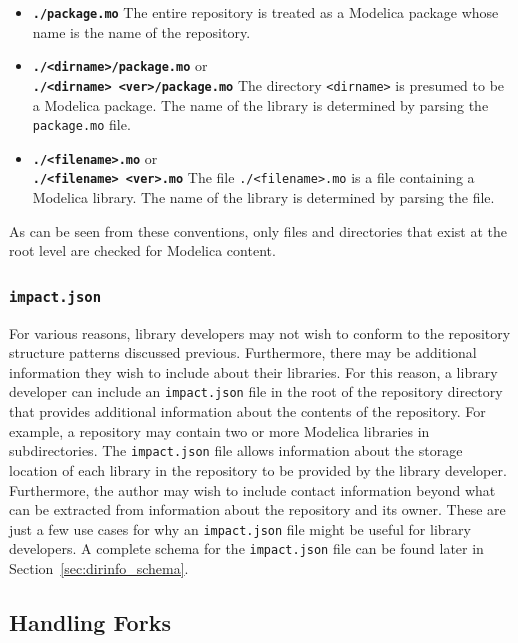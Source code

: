 \documentclass[11pt,a4paper,twocolumn]{article}
\newcommand{\code}[1]{\texttt{#1}} %
\begin{document}
\begin{itemize}[noitemsep]
  \item \textbf{\code{./package.mo}} The entire repository is treated as a Modelica
    package whose name is the name of the repository.

  \item \textbf{\code{./<dirname>/package.mo}} or\\  \textbf{\code{./<dirname>
      <ver>/package.mo}} The directory \code{<dirname>} is presumed to
    be a Modelica package.  The name of the library is determined by
    parsing the \code{package.mo} file.

  \item \textbf{\code{./<filename>.mo}} or\\ \textbf{\code{./<filename> <ver>.mo}} The
    file \code{./<filename>.mo} is a file containing a Modelica
    library.  The name of the library is determined by parsing the
    file.
\end{itemize}

As can be seen from these conventions, only files and directories that
exist at the root level are checked for Modelica content.

\subsubsection{\code{impact.json}}
\label{sec:dirinfo}

For various reasons, library developers may not wish to conform to the
repository structure patterns discussed previous.  Furthermore, there
may be additional information they wish to include about their
libraries.  For this reason, a library developer can include an
\code{impact.json} file in the root of the repository directory that
provides additional information about the contents of the repository.
For example, a repository may contain two or more Modelica libraries
in subdirectories.  The \code{impact.json} file allows information
about the storage location of each library in the repository to be
provided by the library developer.  Furthermore, the author may wish
to include contact information beyond what can be extracted from
information about the repository and its owner.  These are just a few
use cases for why an \code{impact.json} file might be useful for
library developers.  A complete schema for the \code{impact.json} file
can be found later in Section~\ref{sec:dirinfo_schema}.

\subsection{Handling Forks}
\end{document}
